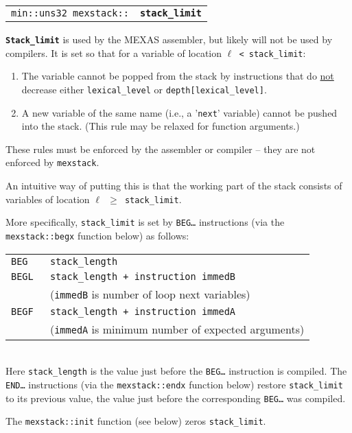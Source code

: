 \documentclass[12pt]{article}
\makeatletter
\newcommand{\TT}[1]{{\tt \bfseries #1}}
\newcommand{\ttindex}[1]{\index{#1@{\tt #1}}}
\newcommand{\EOL}{\penalty \exhyphenpenalty}
\newenvironment{indpar}[1][0.3in]%
	{\begin{list}{}%
		     {\setlength{\itemsep}{0in}%
		      \setlength{\topsep}{0in}%
		      \setlength{\parsep}{1ex}%
		      \setlength{\labelwidth}{#1}%
		      \setlength{\leftmargin}{#1}%
		      \addtolength{\leftmargin}{\labelsep}}%
	 \item}%
	{\end{list}}
\newcommand{\MEXSTACKKEY}[1]%
	   {\TT{#1}\ttindex{mexstack::#1}\ttindex{#1}}
\makeatother
\begin{document}
\begin{tabular}{@{}r@{~~~}l}
\verb|min::uns32 mexstack::| & \MEXSTACKKEY{stack\_limit} \\
\end{tabular}

\begin{indpar}
\TT{Stack\_limit} is used by the MEXAS assembler, but likely will not be
used by compilers.
It is set so that for a variable of location
{\tt $\ell$ < stack\_limit}\label{STACK-LIMIT}:
\begin{enumerate}
\item The variable cannot be popped from the stack by instructions
that do \underline{not} decrease either {\tt lexical\_level} or
{\tt depth[lexical\_level]}.
\item A new variable of the same name (i.e., a '{\tt next}' variable)
cannot be pushed into the stack.  (This rule may be relaxed for
function arguments.)
\end{enumerate}

These rules must be enforced by the assembler or
compiler -- they are not enforced
by {\tt mexstack}.

An intuitive way of putting this is that the working part of the
stack consists of variables of location {\tt $\ell$ $\geq$ stack\_limit}.

More specifically, {\tt stack\_limit} is set by {\tt BEG\ldots}
instructions (via the {\tt mexstack::\EOL begx} function below) as follows: \\
\hspace*{3em}\begin{tabular}{@{}ll}
\tt BEG & \tt stack\_length \\
\tt BEGL & \tt stack\_length + {\rm instruction} immedB \\
         & ({\tt immedB} is number of loop next variables) \\
\tt BEGF & \tt stack\_length + {\rm instruction} immedA \\
         & ({\tt immedA} is minimum number of expected arguments) \\
\end{tabular} \\
Here {\tt stack\_length} is the value just before the {\tt BEG\ldots}
instruction is compiled.
The {\tt END\ldots} instructions (via the {\tt mexstack::endx} function below)
restore {\tt stack\_\EOL limit} to its previous value, the value
just before the corresponding {\tt BEG\ldots} was compiled.

The {\tt mexstack::init} function (see below) zeros {\tt stack\_limit}.
\end{indpar}
\end{document}
